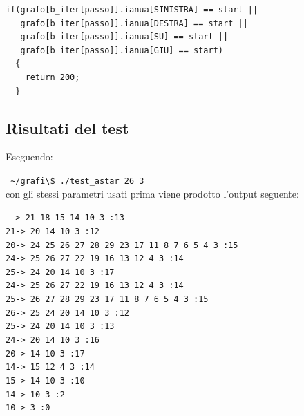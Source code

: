 \documentclass[8pt]{book}
\begin{document}
\begin{spacing}{0.9}
  \begin{small}
    \begin{tcolorbox}
\begin{verbatim}
if(grafo[b_iter[passo]].ianua[SINISTRA] == start ||
   grafo[b_iter[passo]].ianua[DESTRA] == start ||
   grafo[b_iter[passo]].ianua[SU] == start ||
   grafo[b_iter[passo]].ianua[GIU] == start)
  {
    return 200;
  }
\end{verbatim}
  \end{tcolorbox}
    \end{small}
      \end{spacing}

\subsection{Risultati del test}

Eseguendo:

\texttt{
  \newline
  \textasciitilde{}/grafi\textbackslash{}\$ ./test\_astar 26 3
  }\\

con gli stessi parametri usati prima viene prodotto l'output seguente:

\texttt{
  -\textgreater{} 21 18 15 14 10 3 :13\\
21-\textgreater{} 20 14 10 3 :12\\
20-\textgreater{} 24 25 26 27 28 29 23 17 11 8 7 6 5 4 3 :15\\
24-\textgreater{} 25 26 27 22 19 16 13 12 4 3 :14\\
25-\textgreater{} 24 20 14 10 3 :17\\
24-\textgreater{} 25 26 27 22 19 16 13 12 4 3 :14\\
25-\textgreater{} 26 27 28 29 23 17 11 8 7 6 5 4 3 :15\\
26-\textgreater{} 25 24 20 14 10 3 :12\\
25-\textgreater{} 24 20 14 10 3 :13\\
24-\textgreater{} 20 14 10 3 :16\\
20-\textgreater{} 14 10 3 :17\\
14-\textgreater{} 15 12 4 3 :14\\
15-\textgreater{} 14 10 3 :10\\
14-\textgreater{} 10 3 :2\\
10-\textgreater{} 3 :0\\
}
\end{document}
